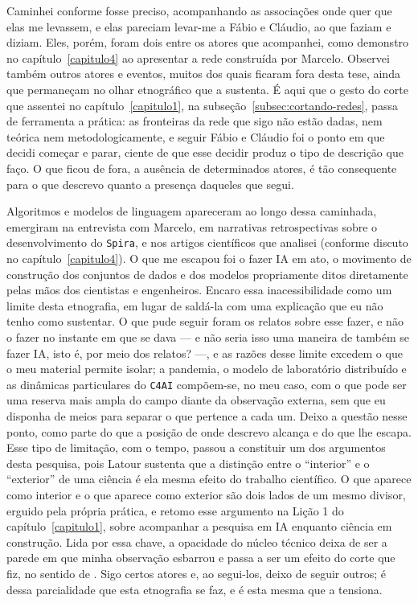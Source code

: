 Caminhei conforme fosse preciso, acompanhando as associações onde quer que elas me levassem, e elas pareciam levar-me a Fábio e Cláudio, ao que faziam e diziam. Eles, porém, foram dois entre os atores que acompanhei, como demonstro no capítulo~\ref{capitulo4} ao apresentar a rede construída por Marcelo. Observei também outros atores e eventos, muitos dos quais ficaram fora desta tese, ainda que permaneçam no olhar etnográfico que a sustenta. É aqui que o gesto do corte que assentei no capítulo~\ref{capitulo1}, na subseção~\ref{subsec:cortando-redes}, passa de ferramenta a prática: as fronteiras da rede que sigo não estão dadas, nem teórica nem metodologicamente, e seguir Fábio e Cláudio foi o ponto em que decidi começar e parar, ciente de que esse decidir produz o tipo de descrição que faço. O que ficou de fora, a ausência de determinados atores, é tão consequente para o que descrevo quanto a presença daqueles que segui.

Algoritmos e modelos de linguagem apareceram ao longo dessa caminhada, emergiram na entrevista com Marcelo, em narrativas retrospectivas sobre o desenvolvimento do \texttt{Spira}, e nos artigos científicos que analisei (conforme discuto no capítulo~\ref{capitulo4}). O que me escapou foi o fazer IA em ato, o movimento de construção dos conjuntos de dados e dos modelos propriamente ditos diretamente pelas mãos dos cientistas e engenheiros. Encaro essa inacessibilidade como um limite desta etnografia, em lugar de saldá-la com uma explicação que eu não tenho como sustentar. O que pude seguir foram os relatos sobre esse fazer, e não o fazer no instante em que se dava --- e não seria isso uma maneira de também se fazer IA, isto é, por meio dos relatos? ---, e as razões desse limite excedem o que o meu material permite isolar; a pandemia, o modelo de laboratório distribuído e as dinâmicas particulares do \texttt{C4AI} compõem-se, no meu caso, com o que pode ser uma reserva mais ampla do campo diante da observação externa, sem que eu disponha de meios para separar o que pertence a cada um. Deixo a questão nesse ponto, como parte do que a posição de onde descrevo alcança e do que lhe escapa. Esse tipo de limitação, com o tempo, passou a constituir um dos argumentos desta pesquisa, pois Latour sustenta que a distinção entre o \enquote{interior} e o \enquote{exterior} de uma ciência é ela mesma efeito do trabalho científico. O que aparece como interior e o que aparece como exterior são dois lados de um mesmo divisor, erguido pela própria prática, e retomo esse argumento na Lição 1 do capítulo~\ref{capitulo1}, sobre acompanhar a pesquisa em IA enquanto ciência em construção. Lida por essa chave, a opacidade do núcleo técnico deixa de ser a parede em que minha observação esbarrou e passa a ser um efeito do corte que fiz, no sentido de \textcite{strathern2011cortando}. Sigo certos atores e, ao segui-los, deixo de seguir outros; é dessa parcialidade que esta etnografia se faz, e é esta mesma que a tensiona.

